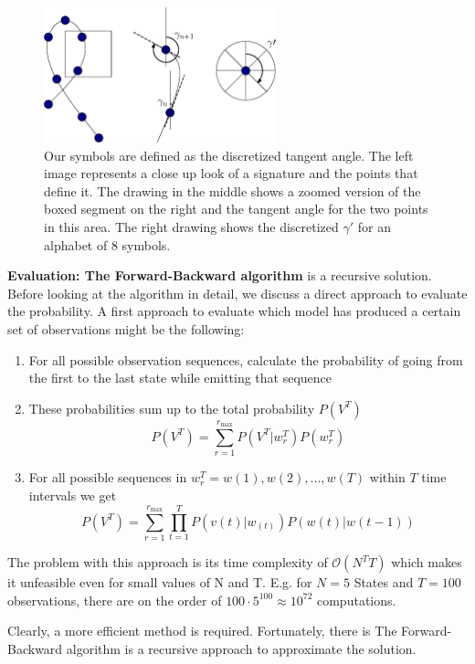 \documentclass[a4paper, oneside]{csthesis}
\begin{document}
\begin{figure}[tb]
    \begin{center}
        \includegraphics[width=0.6\textwidth]{figures/symbol-creation.eps}
    \end{center}
    \caption{Our symbols are defined as the discretized tangent angle. The left image represents a close up look of a signature and the points that define it. The drawing in the middle shows a zoomed version of the boxed segment on the right and the tangent angle for the two points in this area. The right drawing shows the discretized $\gamma\prime$ for an alphabet of 8 symbols.}
    \label{fig:hmm-symbol-creation}
\end{figure}


\textbf{Evaluation: The Forward-Backward algorithm} is a recursive solution. Before looking at the algorithm in detail, we discuss a direct approach to evaluate the probability. A first approach to evaluate which model has produced a certain set of observations might be the following:
\begin{enumerate}
\item For all possible observation sequences, calculate the probability of going from the first to the last state while emitting that sequence
\item These probabilities sum up to the total probability $P(V^T)$
$$P(V^T) = \sum\limits_{r=1}^{r_\text{max}} P(V^T | w_r^T)P(w_r^T)$$
\item For all possible sequences in $w_r^T = w(1), w(2), ..., w(T)$ within $T$ time intervals we get
$$P(V^T) = \sum\limits_{r=1}^{r_\text{max}} \prod\limits_{t=1}^T  P(v(t) | w_(t)) P(w(t)|w(t-1))$$
\end{enumerate}
The problem with this approach is its time complexity of $\mathcal{O}(N^TT)$ which makes it unfeasible even for small values of N and T. E.g. for $N=5$ States and $T=100$ observations, there are on the order of $100 \cdot 5^{100} \approx 10^{72}$ computations.

Clearly, a more efficient method is required. Fortunately, there is The Forward-Backward algorithm is a recursive approach to approximate the solution.
\end{document}
